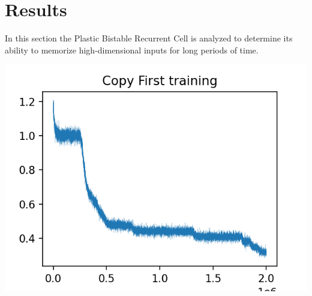 \section{Results}

In this section the Plastic Bistable Recurrent Cell is analyzed to determine its ability to memorize high-dimensional inputs for long periods of time.

\includegraphics{plots/plots}